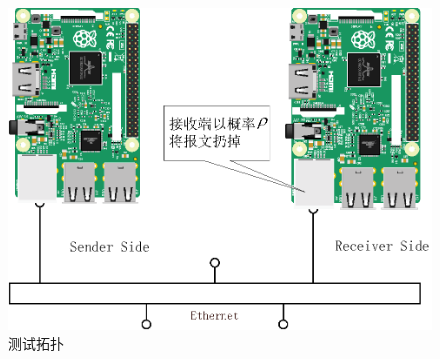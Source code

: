 \begin{figure}[htbp]
	\centering
	\includegraphics[width=5in]{figures/tuopu.eps}
	\caption{测试拓扑}
	\label{TUOPU_EPS}
\end{figure}

